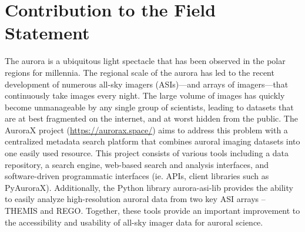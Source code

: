 \documentclass[utf8]{FrontiersinHarvard} %
\begin{document}
\section*{Contribution to the Field Statement}
\noindent The aurora is a ubiquitous light spectacle that has been observed in the polar regions for millennia. The regional scale of the aurora has led to the recent development of numerous all-sky imagers (ASIs)---and arrays of imagers---that continuously take images every night. The large volume of images has quickly become unmanageable by any single group of scientists, leading to datasets that are at best fragmented on the internet, and at worst hidden from the public. The AuroraX project (\url{https://aurorax.space/}) aims to address this problem with a centralized metadata search platform that combines auroral imaging datasets into one easily used resource. This project consists of various tools including a data repository, a search engine, web-based search and analysis interfaces, and software-driven programmatic interfaces (ie. APIs, client libraries such as PyAuroraX). Additionally, the Python library aurora-asi-lib provides the ability to easily analyze high-resolution auroral data from two key ASI arrays – THEMIS and REGO. Together, these tools provide an important improvement to the accessibility and usability of all-sky imager data for auroral science.

 

\end{document}
